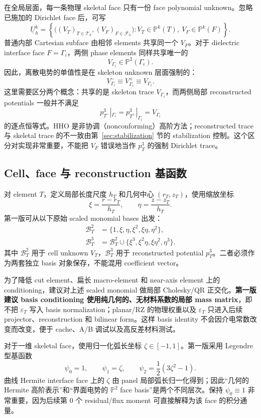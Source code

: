 \documentclass[UTF8,a4paper,11pt]{ctexart}
\newcommand{\Pp}{\mathbb{P}}
\newcommand{\eps}{\varepsilon}
\begin{document}
在全局层面，每一条物理 skeletal face 只有一份 face polynomial unknown。忽略已施加的 Dirichlet face 后，可写
\begin{equation}
\underline U_h^k
=
\left\{
\bigl((V_T)_{T\in\mathcal T_h},(V_F)_{F\in\mathcal F_h}\bigr):
V_T\in\Pp^k(T),\ V_F\in\Pp^k(F)
\right\}.
\label{eq:global_hho_space}
\end{equation}
普通内部 Cartesian subface 由相邻 elements 共享同一个 \(V_F\)。对于 dielectric interface face \(F=\Gamma_i\)，两侧 phase elements 同样共享唯一的
\[
V_{\Gamma_i}\in\Pp^2(\Gamma_i).
\]
因此，离散电势的单值性是在 skeleton unknown 层面强制的：
\[
V_{\Gamma_i}^-\equiv V_{\Gamma_i}^+\equiv V_{\Gamma_i}.
\]
这里需要区分两个概念：共享的是 skeleton trace \(V_{\Gamma_i}\)，而两侧局部 reconstructed potentials 一般并不满足
\[
p_{T^-}^3|_{\Gamma_i}=p_{T^+}^3|_{\Gamma_i}=V_{\Gamma_i}
\]
的逐点恒等式。HHO 是非协调（nonconforming）高阶方法；reconstructed trace 与 skeletal trace 的不一致由第~\ref{sec:stabilization} 节的 stabilization 控制。这个区分对实现非常重要，不能把 \(V_F\) 错误地当作 \(p_T^3\) 的强制 Dirichlet trace。

\subsection{Cell、face 与 reconstruction 基函数}

对 element \(T\)，定义局部长度尺度 \(h_T\) 和几何中心 \((r_T,z_T)\)，使用缩放坐标
\[
\xi=\frac{r-r_T}{h_T},\qquad
\eta=\frac{z-z_T}{h_T}.
\]
第一版可从以下原始 scaled monomial bases 出发：
\begin{align}
\mathcal B_T^2
&=\{1,\xi,\eta,\xi^2,\xi\eta,\eta^2\},\\
\mathcal B_T^3
&=\mathcal B_T^2\cup
\{\xi^3,\xi^2\eta,\xi\eta^2,\eta^3\}.
\end{align}
其中 \(\mathcal B_T^2\) 用于 cell unknown \(V_T\)，\(\mathcal B_T^3\) 用于 reconstructed potential \(p_T^3\)。二者必须作为两套独立 basis 对象保存，不能混用 coefficient vector。

为了降低 cut element、扁长 macro-element 和 near-axis element 上的 conditioning，建议对上述 scaled monomial 做局部 Cholesky/QR 正交化。\textbf{第一版建议 basis conditioning 使用纯几何的、无材料系数的局部 mass matrix}，即不把 \(\eps_T\) 写入 basis normalization；planar/RZ 的物理权重以及 \(\eps_T\) 只进入后续 projector、reconstruction 和 bilinear form。这样 basis identity 不会因介电常数改变而改变，便于 cache、A/B 调试以及高反差材料测试。

对于一维 skeletal face，使用归一化弧长坐标 \(\zeta\in[-1,1]\)。第一版采用 Legendre 型基函数
\begin{equation}
\boxed{
\psi_0=1,\qquad
\psi_1=\zeta,\qquad
\psi_2=\frac12(3\zeta^2-1).
}
\label{eq:face_basis}
\end{equation}
曲线 Hermite interface face 上的 \(\zeta\) 由 panel 局部弧长归一化得到；因此“几何的 Hermite 高阶表示”和“界面电势的 \(\Pp^2\) face basis”是两个不同层次。保持 \(\psi_0\equiv1\) 非常重要，因为后续第 0 个 residual/flux moment 可直接解释为该 face 的积分通量。
\end{document}
